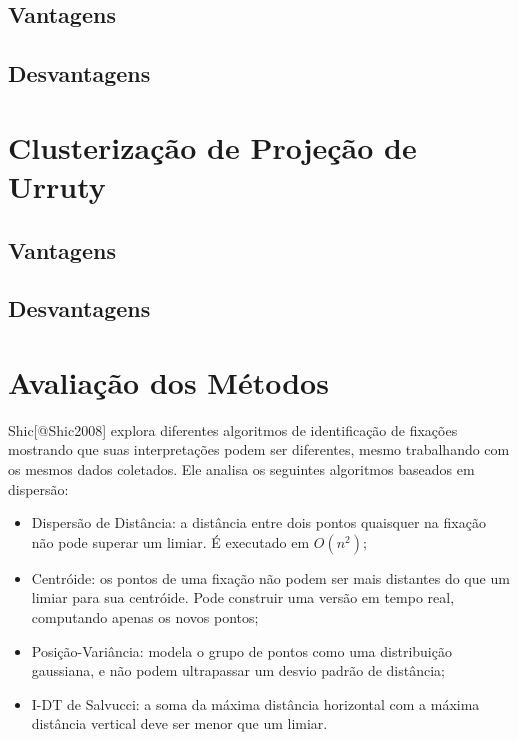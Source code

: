 \subsection{Vantagens}\label{vantagens-7}

\subsection{Desvantagens}\label{desvantagens-7}

\section{Clusterização de Projeção de
Urruty}\label{clusterizauxe7uxe3o-de-projeuxe7uxe3o-de-urruty}

\subsection{Vantagens}\label{vantagens-8}

\subsection{Desvantagens}\label{desvantagens-8}

\section{Avaliação dos Métodos}\label{avaliauxe7uxe3o-dos-muxe9todos}

Shic{[}@Shic2008{]} explora diferentes algoritmos de identificação de
fixações mostrando que suas interpretações podem ser diferentes, mesmo
trabalhando com os mesmos dados coletados. Ele analisa os seguintes
algoritmos baseados em dispersão:

\begin{itemize}
\itemsep1pt\parskip0pt
\item
  Dispersão de Distância: a distância entre dois pontos quaisquer na
  fixação não pode superar um limiar. É executado em $O(n^2)$;
\item
  Centróide: os pontos de uma fixação não podem ser mais distantes do
  que um limiar para sua centróide. Pode construir uma versão em tempo
  real, computando apenas os novos pontos;
\item
  Posição-Variância: modela o grupo de pontos como uma distribuição
  gaussiana, e não podem ultrapassar um desvio padrão de distância;
\item
  I-DT de Salvucci: a soma da máxima distância horizontal com a máxima
  distância vertical deve ser menor que um limiar.
\end{itemize}

